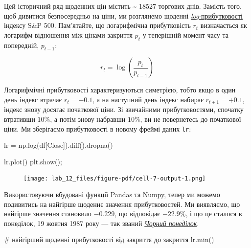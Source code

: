 \documentclass[
  letterpaper,
]{report}
\newenvironment{Shaded}{\begin{snugshade}}{\end{snugshade}}
\newcommand{\BuiltInTok}[1]{\textcolor[rgb]{0.00,0.23,0.31}{#1}}
\newcommand{\CommentTok}[1]{\textcolor[rgb]{0.37,0.37,0.37}{#1}}
\newcommand{\NormalTok}[1]{\textcolor[rgb]{0.00,0.23,0.31}{#1}}
\newcommand{\OperatorTok}[1]{\textcolor[rgb]{0.37,0.37,0.37}{#1}}
\newcommand{\StringTok}[1]{\textcolor[rgb]{0.13,0.47,0.30}{#1}}
\begin{document}
Цей історичний ряд щоденних цін містить \textasciitilde{} 18527 торгових
днів. Замість того, щоб дивитися безпосередньо на ціни, ми розглянемо
щоденні
\href{https://lucaslouca.com/Why-Use-Logarithmic-Returns-In-Time-Series-Modelling/}{\emph{log}-прибутковості}
індексу S\&P 500. Пам'ятайте, що логарифмічна прибутковість \(r_t\)
визначається як логарифм відношення між цінами закриття \(p_t\) у
теперішній момент часу та попередній, \(p_{t-1}\):

\[
r_t = \log(\frac{p_t}{p_{t-1}})
\]

Логарифмічні прибутковості характеризуються симетрією, тобто якщо в один
день індекс втрачає \(r_t = -0.1\), а на наступний день індекс набирає
\(r_{t+1} = +0.1\), індекс знову досягає початкової ціни. Зі звичайними
прибутковостями, спочатку втративши \(10\%\), а потім знову набравши
\(10\%\), ви не повернетесь до початкової ціни. Ми зберігаємо
прибутковості в новому фреймі даних \texttt{lr}:

\begin{Shaded}
\begin{Highlighting}[]
\NormalTok{lr }\OperatorTok{=}\NormalTok{ np.log(df[}\StringTok{\textquotesingle{}Close\textquotesingle{}}\NormalTok{]).diff().dropna()}
\end{Highlighting}
\end{Shaded}

\begin{Shaded}
\begin{Highlighting}[]
\NormalTok{lr.plot()}
\NormalTok{plt.show()}\OperatorTok{;}
\end{Highlighting}
\end{Shaded}

\begin{figure}[H]

{\centering \texttt{[image: lab\_12\_files/figure-pdf/cell-7-output-1.png]}

}

\end{figure}

Використовуючи вбудовані функції Pandas та Numpy, тепер ми можемо
подивитись на найгірше щоденнє значення прибутковостей. Ми виявляємо, що
найгірше значення становило \(-0.229\), що відповідає \(-22.9\%\), і що
це сталося в понеділок, 19 жовтня 1987 року --- так званий
\href{https://en.wikipedia.org/wiki/Black_Monday_(1987)}{\emph{Чорний
понеділок}}.

\begin{Shaded}
\begin{Highlighting}[]
\CommentTok{\# найгірший щоденні прибутковості від закриття до закриття}
\NormalTok{lr.}\BuiltInTok{min}\NormalTok{()}
\end{Highlighting}
\end{Shaded}
\end{document}
